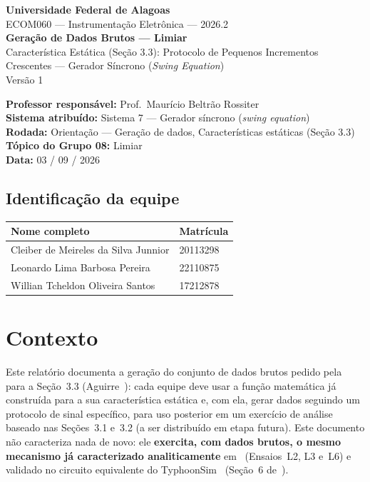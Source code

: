 
\begin{center}
{\large\bfseries Universidade Federal de Alagoas}\\[2pt]
{ECOM060 --- Instrumentação Eletrônica --- 2026.2}\\[10pt]
{\LARGE\bfseries Geração de Dados Brutos --- Limiar}\\[4pt]
{\large Característica Estática (Seção 3.3): Protocolo de Pequenos Incrementos Crescentes ---
Gerador Síncrono (\emph{Swing Equation})}\\[6pt]
{\normalsize Versão 1}
\end{center}

\vspace{4pt}
\noindent\textbf{Professor responsável:} Prof.\ Maurício Beltrão Rossiter\\
\textbf{Sistema atribuído:} Sistema 7 --- Gerador síncrono (\emph{swing equation})\\
\textbf{Rodada:} Orientação --- Geração de dados, Características estáticas (Seção 3.3)\\
\textbf{Tópico do Grupo 08:} Limiar\\
\textbf{Data:} 03 / 09 / 2026

\subsection*{Identificação da equipe}
\begin{center}
\begin{tabular}{ll}
\toprule
\textbf{Nome completo} & \textbf{Matrícula}\\
\midrule
Cleiber de Meireles da Silva Junnior & 20113298\\
Leonardo Lima Barbosa Pereira & 22110875\\
Willian Tcheldon Oliveira Santos & 17212878\\
\bottomrule
\end{tabular}
\end{center}

\section{Contexto}

Este relatório documenta a geração do conjunto de dados brutos pedido
pela~\cite{orientacao2026} para a Seção~3.3 (Aguirre~\cite{aguirre2015}): cada equipe deve usar
a função matemática já construída para a sua característica estática e, com ela, gerar dados
seguindo um protocolo de sinal específico, para uso posterior em um exercício de análise baseado
nas Seções~3.1 e~3.2 (a ser distribuído em etapa futura). Este documento não caracteriza nada de
novo: ele \textbf{exercita, com dados brutos, o mesmo mecanismo já caracterizado
analiticamente} em~\cite{limiarv1} (Ensaios~L2, L3 e~L6) e validado no circuito equivalente do
TyphoonSim~\cite{typhoon} (Seção~6 de~\cite{limiarv1}).

